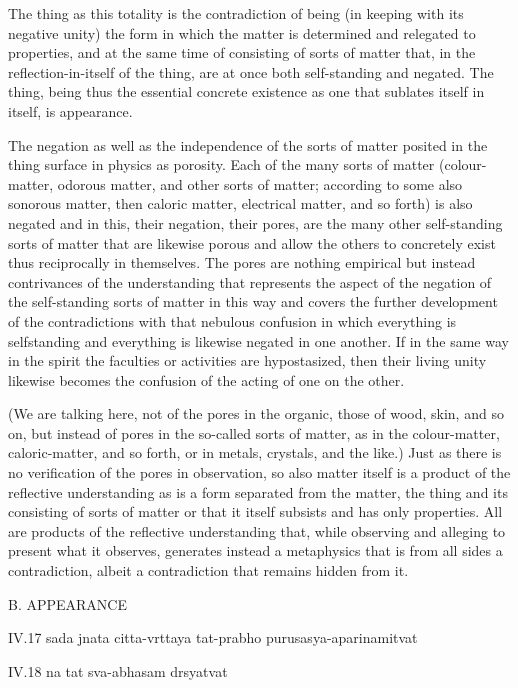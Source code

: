 The thing as this totality is the contradiction of being
(in keeping with its negative unity)
the form in which the matter is determined and relegated to properties, and
at the same time of consisting of sorts of matter that,
in the reflection-in-itself of the thing, are
at once both self-standing and negated.
The thing, being thus the essential concrete existence
as one that sublates itself in itself, is appearance.

    The negation as well as the independence of the sorts of matter
    posited in the thing surface in physics as porosity.
    Each of the many sorts of matter
    (colour-matter, odorous matter, and other sorts of matter;
    according to some also sonorous matter, then caloric matter,
    electrical matter, and so forth)
    is also negated and in this, their negation,
    their pores, are the many other self-standing sorts of
    matter that are likewise porous and allow the others to concretely
    exist thus reciprocally in themselves.
    The pores are nothing empirical but instead contrivances of
    the understanding that represents the
    aspect of the negation of the self-standing sorts of matter in this
    way and covers the further development of the contradictions with
    that nebulous confusion in which everything is selfstanding and
    everything is likewise negated in one another.
    If in the same way in the spirit
    the faculties or activities are hypostasized,
    then their living unity likewise becomes
    the confusion of the acting of one on the other.

    (We are talking here, not of the pores in the organic,
    those of wood, skin, and so on, but instead of pores
    in the so-called sorts of matter, as in the colour-matter,
    caloric-matter, and so forth, or in metals, crystals, and the like.)
    Just as there is no verification of the pores in observation,
    so also matter itself is a product of the reflective understanding as
    is a form separated from the matter, the thing and its consisting of
    sorts of matter or that it itself subsists and has only properties.
    All are products of the reflective understanding that,
    while observing and alleging to present what it observes,
    generates instead a metaphysics that is from all sides a contradiction,
    albeit a contradiction that remains hidden from it.

B. APPEARANCE


IV.17
sada jnata citta-vrttaya tat-prabho purusasya-aparinamitvat

IV.18
na tat sva-abhasam drsyatvat

